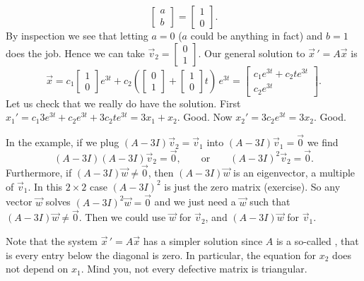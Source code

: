 \documentclass[12pt]{book}
\begin{document}
\begin{example}
\begin{equation*}
\begin{bmatrix}
a \\ b
\end{bmatrix}
=
\begin{bmatrix}
1 \\ 0
\end{bmatrix} .
\end{equation*}
By inspection we see that letting $a=0$ ($a$ could be anything in fact) and
$b=1$ does the job.  Hence we can take $\vec{v}_2 = 
\left[ \begin{smallmatrix} 0 \\ 1 \end{smallmatrix} \right]$.  Our general
solution to
${\vec{x}\,}' = A\vec{x}$ is
\begin{equation*}
\vec{x} =
c_1 
\begin{bmatrix}
1 \\ 0
\end{bmatrix}
e^{3t}
+
c_2
\left(
\begin{bmatrix}
0 \\ 1
\end{bmatrix}
+
\begin{bmatrix}
1 \\ 0
\end{bmatrix}
t
\right)
\,
e^{3t}
=
\begin{bmatrix}
c_1 e^{3t}+c_2 te^{3t} \\
c_2 e^{3t}
\end{bmatrix} .
\end{equation*}
Let us check that we really do have the solution.  First
$x_1' = 
c_1 3 e^{3t}+c_2 e^{3t} + 3 c_2 te^{3t} = 3 x_1 + x_2$.  Good.  Now
$x_2' = 3 c_2 e^{3t} = 3x_2$.  Good.
\end{example}

In the example, if we plug $(A-3I)\vec{v}_2 = \vec{v}_1$ into
$(A-3I)\vec{v}_1 = \vec{0}$ we find
\begin{equation*}
(A-3I)(A-3I) \vec{v}_2 = \vec{0},
\qquad \text{or} \qquad
{(A-3I)}^2\vec{v}_2 = \vec{0}.
\end{equation*}
Furthermore, if 
$(A-3I) \vec{w} \not= \vec{0}$, then 
$(A-3I) \vec{w}$ is an eigenvector, a multiple of $\vec{v}_1$.
In this $2 \times 2$ case ${(A-3I)}^2$ is just the zero matrix (exercise).
So any vector $\vec{w}$ solves
${(A-3I)}^2\vec{w} = \vec{0}$ and we just need a $\vec{w}$ such that
$(A-3I)\vec{w} \not= \vec{0}$.  Then we could use
$\vec{w}$ for $\vec{v}_2$, and $(A-3I)\vec{w}$ for $\vec{v}_1$.

Note that the system ${\vec{x}\,}' = A \vec{x}$ has a simpler solution since
$A$ is a so-called \emph{}, that is
every entry below the diagonal is zero.
In particular, the equation for $x_2$
does not depend on $x_1$.  Mind you, not every defective matrix is
triangular.
\end{document}
